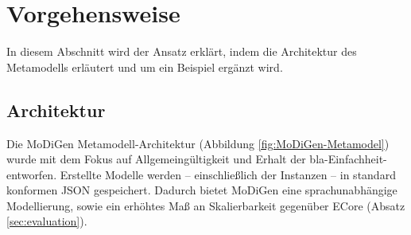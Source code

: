 \section{Vorgehensweise}
In diesem Abschnitt wird der Ansatz erkl\"art, indem die Architektur des Metamodells erl\"autert und um ein Beispiel erg\"anzt wird.

\subsection{Architektur}
Die MoDiGen Metamodell-Architektur (Abbildung \ref{fig:MoDiGen-Metamodel}) wurde mit dem Fokus auf Allgemeingültigkeit und Erhalt der bla-Einfachheit- entworfen. Erstellte Modelle werden -- einschließlich der Instanzen -- in standard konformen JSON gespeichert. Dadurch bietet MoDiGen eine sprachunabhängige Modellierung, sowie ein erhöhtes Maß an Skalierbarkeit gegenüber ECore (Absatz \ref{sec:evaluation}).



